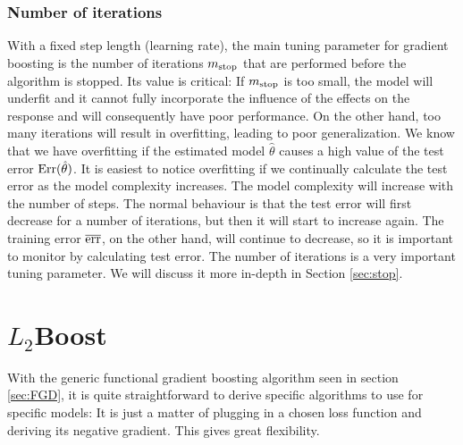 \subsubsection{Number of iterations}\label{subsec:iterations}
With a fixed step length (learning rate), the main tuning parameter for gradient boosting is the number of iterations $m_{\text{stop}}$ that are performed before the algorithm is stopped.
Its value is critical:
If $m_{\text{stop}}$ is too small, the model will underfit and it cannot fully incorporate the influence of the effects on the response and will consequently have poor performance.
On the other hand, too many iterations will result in overfitting, leading to poor generalization.
We know that we have overfitting if the estimated model $\hat{\theta}$ causes a high value of the test error $\text{Err}(\hat{\theta})$.
It is easiest to notice overfitting if we continually calculate the test error as the model complexity increases.
The model complexity will increase with the number of steps.
The normal behaviour is that the test error will first decrease for a number of iterations, but then it will start to increase again.
The training error $\overline{\text{err}}$, on the other hand, will continue to decrease, so it is important to monitor by calculating test error.
The number of iterations is a very important tuning parameter.
We will discuss it more in-depth in Section \ref{sec:stop}.



\section{$L_2$Boost}
With the generic functional gradient boosting algorithm seen in section \ref{sec:FGD}, it is quite straightforward to derive specific algorithms to use for specific models:
It is just a matter of plugging in a chosen loss function and deriving its negative gradient.
This gives great flexibility.

